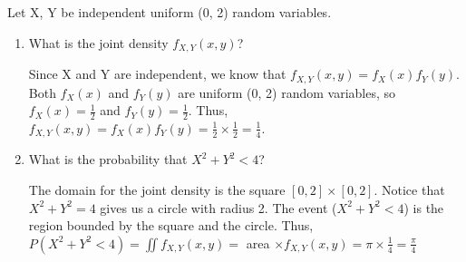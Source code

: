\question Let X, Y be independent uniform (0, 2) random variables. 

\begin{enumerate}[label=(\alph*)] 
\item What is the joint density $f_{X, Y}(x, y)$? 
\begin{solution}[4cm] 
Since X and Y are independent, we know that $f_{X, Y}(x, y) = f_X(x) f_Y(y)$. \\ 
Both $f_X(x)$ and $f_Y(y)$ are uniform (0, 2) random variables, so $f_X(x) = \frac{1}{2}$ and $f_Y(y) = \frac{1}{2}$. Thus, $f_{X, Y}(x, y) = f_X(x) f_Y(y) =  \frac{1}{2} \times \frac{1}{2} =  \frac{1}{4}$. 
\end{solution}

\item What is the probability that $X^2 + Y^2 < 4$? 
\begin{solution}[4cm]
The domain for the joint density is the square $[0, 2] \times [0, 2]$. Notice that $X^2 + Y^2 = 4$ gives us a circle with radius 2. The event ($X^2 + Y^2 < 4$) is the region bounded by the square and the circle. Thus, $P(X^2 + Y^2 < 4) = \iint f_{X, Y} (x, y) =$ area $\times f_{X, Y} (x, y) = \pi \times \frac{1}{4} = \frac{\pi}{4}$ 
\end{solution}
\end{enumerate}